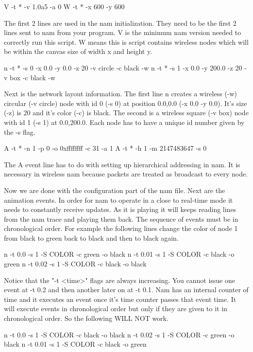 \begin{program}
V -t * -v 1.0a5 -a 0
W -t * -x 600 -y 600
\end{program}

The first 2 lines are used in the nam initialization.  They need to be
the first 2 lines sent to nam from your program. V is the minimum nam
version needed to correctly run this script.  W means this is script
contains wireless nodes which will be within the canvas size of width x
and height y.

\begin{program}
n -t * -s 0 -x 0.0 -y 0.0 -z 20 -v circle -c black -w
n -t * -s 1 -x 0.0 -y 200.0 -z 20 -v box -c black -w
\end{program}

Next is the network layout information.  The first line n creates a
wireless (-w) circular (-v circle) node with id 0 (-s 0) at position
0.0,0.0 (-x 0.0 -y 0.0). It's size (-z) is 20 and it's color (-c) is
black.  The second is a wireless square (-v box) node with id 1 (-s 1)
at 0.0,200.0.  Each node has to have a unique id number given by the -s
flag.

\begin{program}
A -t * -n 1 -p 0 -o 0xffffffff -c 31 -a 1
A -t * -h 1 -m 2147483647 -s 0
\end{program}

The A event line has to do with setting up hierarchical addressing in
nam.  It is necessary in wireless nam because packets are treated as
broadcast to every node.

Now we are done with the configuration part of the nam file.  Next are
the animation events.  In order for nam to operate in a close to
real-time mode it needs to constantly receive updates.  As it is playing
it will  keeps reading lines from the nam trace and playing them back.
The sequence of events must be in chronological order.  For example the
following lines change the color of node 1 from black to green back to
black and then to black again.
\begin{program}
n -t 0.0 -s 1 -S COLOR -c green -o black
n -t 0.01 -s 1 -S COLOR -c black -o green
n -t 0.02 -s 1 -S COLOR -c black -o black
\end{program}

Notice that the "-t <time>" flags are always increasing.  You cannot
issue one event at -t 0.2 and then another later on at -t 0.1.  Nam has
an internal counter of time and it executes an event once it's time
counter passes that event time.  It will execute events in chronological
order but only if they are given to it in chronological order.  So the
following WILL NOT work.
\begin{program}
n -t 0.0 -s 1 -S COLOR -c black -o black
n -t 0.02 -s 1 -S COLOR -c green -o black
n -t 0.01 -s 1 -S COLOR -c black -o green
\end{program}

